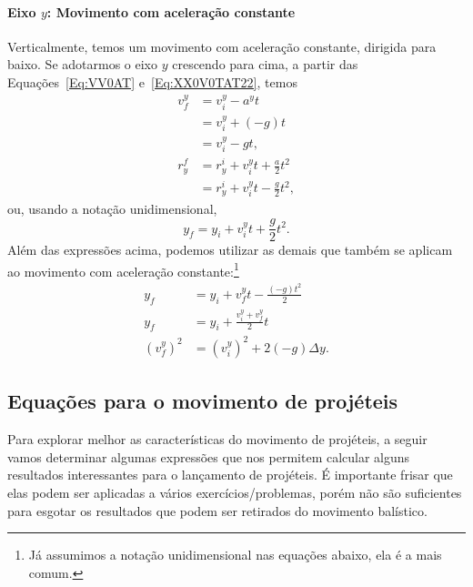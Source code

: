 \paragraph{Eixo $y$: Movimento com aceleração constante}

Verticalmente, temos um movimento com aceleração constante, dirigida para baixo. Se adotarmos o eixo $y$ crescendo para cima, a partir das Equações~\eqref{Eq:VV0AT} e~\eqref{Eq:XX0V0TAT22}, temos
\begin{align}
  v_{f}^y &= v_{i}^y - a^y t \\
  &= v_{i}^y + (-g) t \\
  &= v_{i}^y - g t, \\
  r_y^f &= r_y^i + v_{i}^y t + \frac{a}{2}t^2 \\
  &= r_y^i + v_{i}^y t - \frac{g}{2}t^2, \label{Eq:PosYProj}
\end{align}
%
ou, usando a notação unidimensional,
\begin{equation}
    y_f = y_i + v_{i}^y t + \frac{g}{2}t^2.
\end{equation}
%
Além das expressões acima, podemos utilizar as demais que também se aplicam ao movimento com aceleração constante:\footnote{Já assumimos a notação unidimensional nas equações abaixo, ela é a mais comum.}
\begin{align}
	y_f &= y_i + v_f^y t - \frac{(-g)t^2}{2} \\
	y_f &= y_i + \frac{v_i^y + v_f^y}{2} t \\
	(v_f^y)^2 &= (v_i^y)^2 + 2 (-g) \Delta y. \label{Eq:TorricelliMovProj}
\end{align}

\subsection{Equações para o movimento de projéteis}

Para explorar melhor as características do movimento de projéteis, a seguir vamos determinar algumas expressões que nos permitem calcular alguns resultados interessantes para o lançamento de projéteis. É importante frisar que elas podem ser aplicadas a vários exercícios/problemas, porém não são suficientes para esgotar os resultados que podem ser retirados do movimento balístico.

